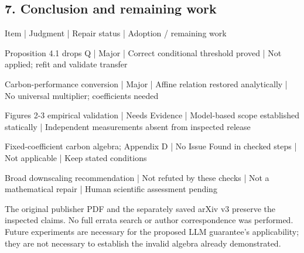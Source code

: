 \documentclass[10pt]{article}
\begin{document}
\subsection*{7. Conclusion and remaining work}
Item | Judgment | Repair status | Adoption / remaining work\par
Proposition 4.1 drops Q | Major | Correct conditional threshold proved | Not applied; refit and validate transfer\par
Carbon-performance conversion | Major | Affine relation restored analytically | No universal multiplier; coefficients needed\par
Figures 2-3 empirical validation | Needs Evidence | Model-based scope established statically | Independent measurements absent from inspected release\par
Fixed-coefficient carbon algebra; Appendix D | No Issue Found in checked steps | Not applicable | Keep stated conditions\par
Broad downscaling recommendation | Not refuted by these checks | Not a mathematical repair | Human scientific assessment pending\par
The original publisher PDF and the separately saved arXiv v3 preserve the inspected claims. No full errata search or author correspondence was performed. Future experiments are necessary for the proposed LLM guarantee’s applicability; they are not necessary to establish the invalid algebra already demonstrated.\par
\end{document}
